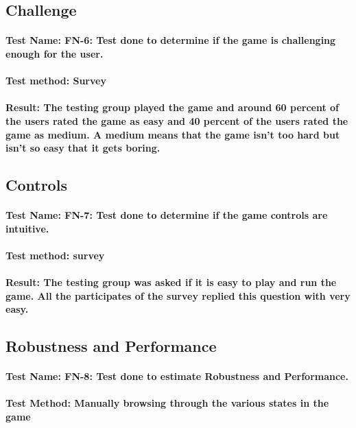 \documentclass[12pt, titlepage]{article}
\begin{document}
\subsection	{Challenge}
\paragraph {Test Name: FN-6: Test done to determine if the game is challenging enough for the user.}
\paragraph {Test method: Survey}
\paragraph {Result: The testing group played the game and around 60 percent of the users rated the game as easy and 40 percent of the users rated the game as medium. A medium means that the game isn’t too hard but isn’t so easy that it gets boring. }

\subsection	{ Controls}
\paragraph {Test Name: FN-7: Test done to determine if the game controls are intuitive.}
\paragraph {Test method: survey}
\paragraph {Result: The testing group was asked if it is easy to play and run the game. All the participates of the survey replied this question with very easy.}

\subsection {Robustness and Performance}
\paragraph {Test Name: FN-8: Test done to estimate Robustness and Performance.}
\paragraph {Test Method: Manually browsing through the various states in the game}
\end{document}
